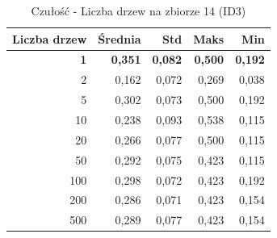 \begin{table}[htbp]
\centering
\small
\setlength{\tabcolsep}{6pt}
\renewcommand{\arraystretch}{1.2}
\caption{Czułość - Liczba drzew na zbiorze 14 (ID3)}
\label{tab:ID3_tree_count_14_recall}
\begin{tabular}{r|r|r|r|r}
\toprule
Liczba drzew & Średnia & Std & Maks & Min \\
\hline
\textbf{1} & \textbf{0,351} & \textbf{0,082} & \textbf{0,500} & \textbf{0,192} \\
2 & 0,162 & 0,072 & 0,269 & 0,038 \\
5 & 0,302 & 0,073 & 0,500 & 0,192 \\
10 & 0,238 & 0,093 & 0,538 & 0,115 \\
20 & 0,266 & 0,077 & 0,500 & 0,115 \\
50 & 0,292 & 0,075 & 0,423 & 0,115 \\
100 & 0,298 & 0,072 & 0,423 & 0,192 \\
200 & 0,286 & 0,071 & 0,423 & 0,154 \\
500 & 0,289 & 0,077 & 0,423 & 0,154 \\
\bottomrule
\end{tabular}
\end{table}